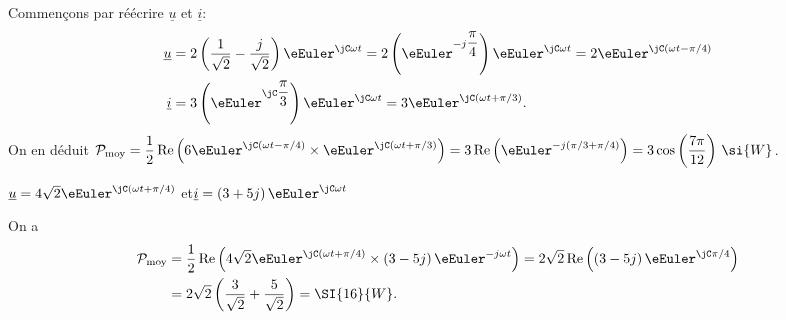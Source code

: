 \begin{corrige}
Commençons par réécrire $\underline{u}$ et $\underline{i}$:
\begin{align*}
\underline{u} & =2\left(\dfrac{1}{\sqrt{2}}-\dfrac{j}{\sqrt{2}}\right)\eEuler^{\jC \omega t}=2\left(\eEuler^{-j\dfrac{\pi}{4}}\right)\eEuler^{\jC \omega t}=2\eEuler^{\jC \left(\omega t-\pi/4\right)}\\
\underline{i} & =3\left(\eEuler^{\jC \dfrac{\pi}{3}}\right)\eEuler^{\jC \omega t}=3\eEuler^{\jC \left(\omega t+\pi/3\right)}.
\end{align*}
On en déduit
$\mathcal{P}_{\text{moy}}=\dfrac{1}{2}\operatorname{Re}\left(6\eEuler^{\jC \left(\omega t-\pi/4\right)}\times \eEuler^{\jC \left(\omega t+\pi/3\right)}\right)=3\operatorname{Re}\left(\eEuler^{-j\left(\pi/3+\pi/4\right)}\right)=3\cos\left(\dfrac{7\pi}{12}\right)\,\si{W}$.
\end{corrige}





\begin{enonce}
$\underline{u}=4\sqrt{2}\eEuler^{\jC \left(\omega t+\pi/4\right)}$  \quad et\quad $\underline{i}=\left(3+5j\right)\eEuler^{\jC \omega t}$
\end{enonce}


\begin{corrige}
On a 
\begin{align*}
\mathcal{P}_{\text{moy}} 
& =\dfrac{1}{2}\operatorname{Re}\left(4\sqrt{2}\eEuler^{\jC \left(\omega t+\pi/4\right)}\times\left(3-5j\right)\eEuler^{-j\omega t}\right)=2\sqrt{2}\operatorname{Re}\left(\left(3-5j\right)\eEuler^{\jC \pi/4}\right)\\
 & =2\sqrt{2}\left(\dfrac{3}{\sqrt{2}}+\dfrac{5}{\sqrt{2}}\right)=\SI{16}{W}.
\end{align*}
\end{corrige}



\finEntrainement




\newpage



